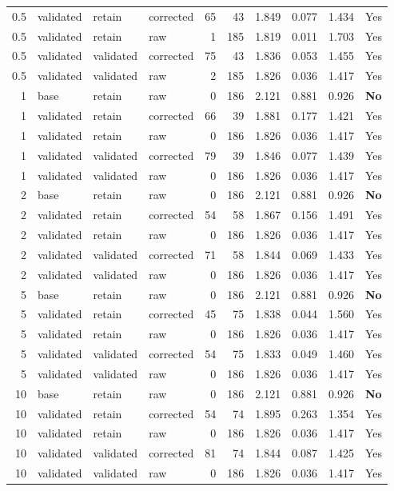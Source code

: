 {\begin{longtable}{rlllrrrrrl}
0.5 & validated & retain & corrected & 65 & 43 & 1.849 & 0.077 & 1.434 & Yes\\
0.5 & validated & retain & raw & 1 & 185 & 1.819 & 0.011 & 1.703 & Yes\\
0.5 & validated & validated & corrected & 75 & 43 & 1.836 & 0.053 & 1.455 & Yes\\
0.5 & validated & validated & raw & 2 & 185 & 1.826 & 0.036 & 1.417 & Yes\\
1 & base & retain & raw & 0 & 186 & 2.121 & 0.881 & 0.926 & \textbf{No}\\
1 & validated & retain & corrected & 66 & 39 & 1.881 & 0.177 & 1.421 & Yes\\
1 & validated & retain & raw & 0 & 186 & 1.826 & 0.036 & 1.417 & Yes\\
1 & validated & validated & corrected & 79 & 39 & 1.846 & 0.077 & 1.439 & Yes\\
1 & validated & validated & raw & 0 & 186 & 1.826 & 0.036 & 1.417 & Yes\\
2 & base & retain & raw & 0 & 186 & 2.121 & 0.881 & 0.926 & \textbf{No}\\
2 & validated & retain & corrected & 54 & 58 & 1.867 & 0.156 & 1.491 & Yes\\
2 & validated & retain & raw & 0 & 186 & 1.826 & 0.036 & 1.417 & Yes\\
2 & validated & validated & corrected & 71 & 58 & 1.844 & 0.069 & 1.433 & Yes\\
2 & validated & validated & raw & 0 & 186 & 1.826 & 0.036 & 1.417 & Yes\\
5 & base & retain & raw & 0 & 186 & 2.121 & 0.881 & 0.926 & \textbf{No}\\
5 & validated & retain & corrected & 45 & 75 & 1.838 & 0.044 & 1.560 & Yes\\
5 & validated & retain & raw & 0 & 186 & 1.826 & 0.036 & 1.417 & Yes\\
5 & validated & validated & corrected & 54 & 75 & 1.833 & 0.049 & 1.460 & Yes\\
5 & validated & validated & raw & 0 & 186 & 1.826 & 0.036 & 1.417 & Yes\\
10 & base & retain & raw & 0 & 186 & 2.121 & 0.881 & 0.926 & \textbf{No}\\
10 & validated & retain & corrected & 54 & 74 & 1.895 & 0.263 & 1.354 & Yes\\
10 & validated & retain & raw & 0 & 186 & 1.826 & 0.036 & 1.417 & Yes\\
10 & validated & validated & corrected & 81 & 74 & 1.844 & 0.087 & 1.425 & Yes\\
10 & validated & validated & raw & 0 & 186 & 1.826 & 0.036 & 1.417 & Yes\\
\end{longtable}}
